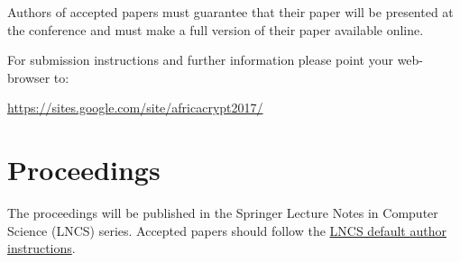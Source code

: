 \documentclass[letterpaper]{article}
\begin{document}
\begin{tabularx}{\linewidth}
  Authors of accepted papers must guarantee that their
  paper will be presented at the conference and must make a full
  version of their paper available online.\par\bigskip  

  For submission instructions and further
  information please point your web-browser to:
  \begin{center}
    \url{https://sites.google.com/site/africacrypt2017/}
  \end{center}
  
  \section*{Proceedings}
  The proceedings will be published in the Springer Lecture Notes in
  Computer Science (LNCS) series. Accepted papers should follow the
  \href{https://www.springer.com/computer/lncs?SGWID=0-164-6-793341-0}{LNCS default author instructions}. 
\end{tabularx}
\end{document}
